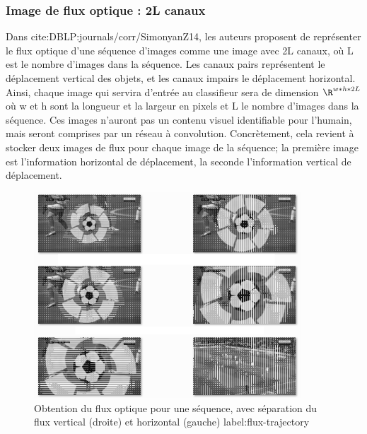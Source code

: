 \documentclass[11pt]{article}
\begin{document}
\subsubsection{Image de flux optique : 2L canaux}
\label{sec:org0cbcc0e}
Dans cite:DBLP:journals/corr/SimonyanZ14, les auteurs proposent de représenter le flux optique d'une séquence d'images comme une image avec 2L canaux, où L est le nombre d'images dans la séquence. Les canaux pairs représentent le déplacement vertical des objets, et les canaux impairs le déplacement horizontal. Ainsi, chaque image qui servira d'entrée au classifieur sera de dimension \(\R^{w*h*2L}\) où w et h sont la longueur et la largeur en pixels et L le nombre d'images dans la séquence. Ces images n'auront pas un contenu visuel identifiable pour l'humain, mais seront comprises par un réseau à convolution. Concrètement, cela revient à stocker deux images de flux pour chaque image de la séquence; la première image est l'information horizontal de déplacement, la seconde l'information vertical de déplacement.\\
\begin{figure}[htbp]
\centering
\includegraphics[width=10cm]{optical_flow_two_stream.png}
\caption{Obtention du flux optique pour une séquence, avec séparation du flux vertical (droite) et horizontal (gauche) label:flux-trajectory}
\end{figure}
\end{document}
